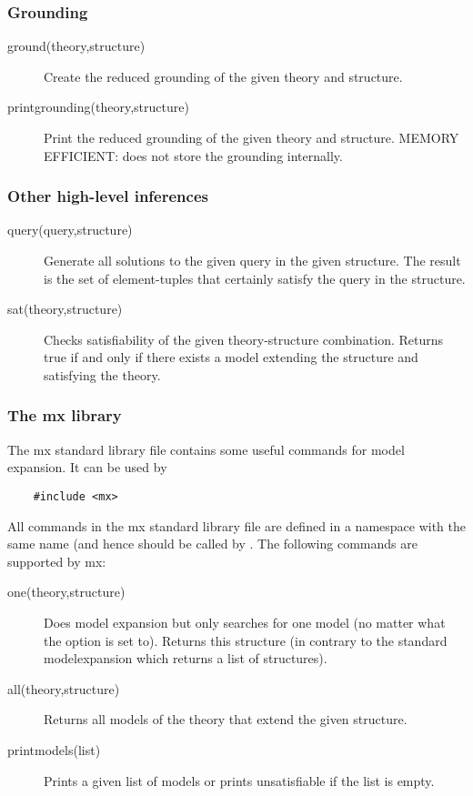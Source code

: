 \documentclass[a4]{article}
\begin{document}
\subsubsection{Grounding}
\begin{description}
	\item[ground(theory,structure)]
 		Create the reduced grounding of the given theory and structure. 
	\item[printgrounding(theory,structure)]
 		Print the reduced grounding of the given theory and structure.
 		MEMORY EFFICIENT: does not store the grounding internally.
\end{description}

\subsubsection{Other high-level inferences}
\begin{description}
	\item[query(query,structure)]
 		Generate all solutions to the given query in the given structure. The result is the set of element-tuples that certainly satisfy the query in the structure.
	\item[sat(theory,structure)]
		Checks satisfiability of the given theory-structure combination. Returns true if and only if there exists a model extending the structure and satisfying the theory.
\end{description}

\subsubsection{The mx library}
The mx standard library file contains some useful commands for model expansion. It can be used by 
\begin{lstlisting}
	#include <mx>
\end{lstlisting}
All commands in the mx standard library file are defined in a namespace with the same name (and hence should be called by .
The following commands are supported by mx:
\begin{description}
	\item[one(theory,structure)]
		Does model expansion but only searches for one model (no matter what the  option is set to). Returns this structure (in contrary to the standard modelexpansion which returns a list of structures).
	\item[all(theory,structure)] 
		Returns all models of the theory that extend the given structure.
	\item[printmodels(list)]
		Prints a given list of models or prints unsatisfiable if the list is empty.
\end{description}
\end{document}

